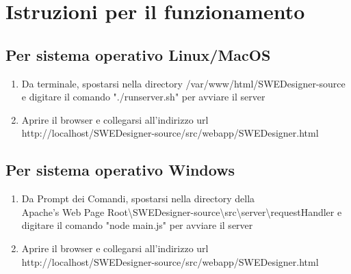\documentclass[../ManualeUtente.tex]{subfiles}
\begin{document}
	\section{Istruzioni per il funzionamento}\label{sez:funcIstr}
		\subsection{Per sistema operativo Linux/MacOS}
		 	\begin{enumerate}
		 		\item Da terminale, spostarsi nella directory /var/www/html/SWEDesigner-source e digitare il comando
		 		"./runserver.sh" per avviare il server
	 			\item Aprire il browser e collegarsi all'indirizzo url\\
	 			http://localhost/SWEDesigner-source/src/webapp/SWEDesigner.html
		 	\end{enumerate}
		\subsection{Per sistema operativo Windows}
			\begin{enumerate}
		 		\item Da Prompt dei Comandi, spostarsi nella directory della\\
		 		Apache's Web Page Root\textbackslash SWEDesigner-source\textbackslash src\textbackslash server\textbackslash requestHandler e digitare il comando "node main.js"
		 		per avviare il server
		 		\item Aprire il browser e collegarsi all'indirizzo url\\
		 		http://localhost/SWEDesigner-source/src/webapp/SWEDesigner.html
		 	\end{enumerate}
\end{document}
